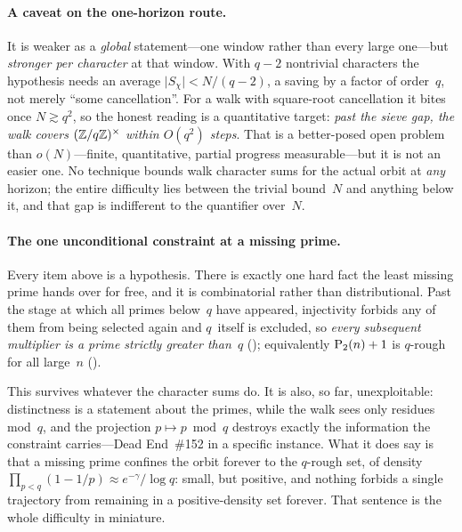 \paragraph{A caveat on the one-horizon route.}
It is weaker as a \emph{global} statement---one window rather than every
large one---but \emph{stronger per character} at that window.  With
$q-2$ nontrivial characters the hypothesis needs an average
$\lvert S_\chi \rvert < N/(q-2)$, a saving by a factor of order~$q$,
not merely ``some cancellation''.  For a walk with square-root
cancellation it bites once $N \gtrsim q^2$, so the honest reading is a
quantitative target: \emph{past the sieve gap, the walk covers
$(\mathbb{Z}/q\mathbb{Z})^\times$ within $O(q^2)$ steps}.  That is a better-posed open
problem than $o(N)$---finite, quantitative, partial progress
measurable---but it is not an easier one.  No technique bounds walk
character sums for the actual orbit at \emph{any} horizon; the entire
difficulty lies between the trivial bound~$N$ and anything below it, and
that gap is indifferent to the quantifier over~$N$.

\paragraph{The one unconditional constraint at a missing prime.}
Every item above is a hypothesis.  There is exactly one hard fact the
least missing prime hands over for free, and it is combinatorial rather
than distributional.  Past the stage at which all primes below~$q$ have
appeared, injectivity forbids any of them from being selected again and
$q$~itself is excluded, so \emph{every subsequent multiplier is a prime
strictly greater than~$q$}
(); equivalently
$\mathrm{P}_{2}(n)+1$ is $q$-rough for all large~$n$
().

This survives whatever the character sums do.  It is also, so far,
unexploitable: distinctness is a statement about the primes, while the
walk sees only residues mod~$q$, and the projection
$p \mapsto p \bmod q$ destroys exactly the information the constraint
carries---Dead End~\#152 in a specific instance.  What it does say is
that a missing prime confines the orbit forever to the $q$-rough set, of
density $\prod_{p<q}(1-1/p) \approx e^{-\gamma}/\log q$: small, but
positive, and nothing forbids a single trajectory from remaining in a
positive-density set forever.  That sentence is the whole difficulty in
miniature.

